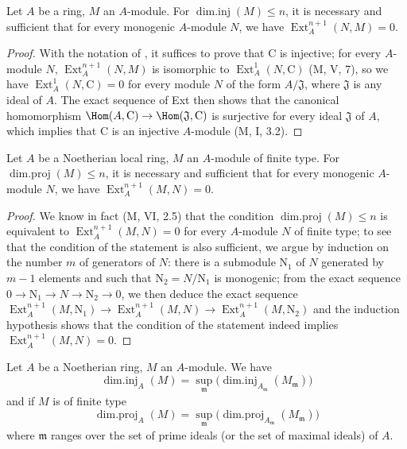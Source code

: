 \begin{lemma}[17.2.3]
\label{0.17.2.3}
Let $A$ be a ring, $M$ an $A$-module.
For $\operatorname{dim.inj}(M)\leq n$, it is necessary and sufficient that for every monogenic $A$-module $N$, we have $\operatorname{Ext}^{n+1}_A(N,M)=0$.
\end{lemma}

\begin{proof}
With the notation of , it suffices to prove that $\mathrm{C}$ is injective;
for every $A$-module $N$, $\operatorname{Ext}^{n+1}_A(N,M)$ is isomorphic to $\operatorname{Ext}^1_A(N,\mathrm{C})$ (M, V, 7), so we have $\operatorname{Ext}^1_A(N,\mathrm{C})=0$ for every module $N$ of the form $A/\mathfrak{J}$, where $\mathfrak{J}$ is any ideal of $A$.
The exact sequence of Ext then shows that the canonical homomorphism $\Hom(A,\mathrm{C})\to\Hom(\mathfrak{J},\mathrm{C})$ is surjective for every ideal $\mathfrak{J}$ of $A$, which implies that $\mathrm{C}$ is an injective $A$-module (M, I, 3.2).
\end{proof}

\begin{lemma}[17.2.4]
\label{0.17.2.4}
Let $A$ be a Noetherian local ring, $M$ an $A$-module of finite type.
For $\operatorname{dim.proj}(M)\leq n$, it is necessary and sufficient that for every monogenic $A$-module $N$, we have $\operatorname{Ext}^{n+1}_A(M,N)=0$.
\end{lemma}

\begin{proof}
We know in fact (M, VI, 2.5) that the condition $\operatorname{dim.proj}(M)\leq n$ is equivalent to $\operatorname{Ext}^{n+1}_A(M,N)=0$ for every $A$-module $N$ of finite type;
to see that the condition of the statement is also sufficient, we argue by induction on the number $m$ of generators of $N$:
there is a submodule $\mathrm{N}_1$ of $N$ generated by $m-1$ elements and such that $\mathrm{N}_2=N/\mathrm{N}_1$ is monogenic;
from the exact sequence $0\to\mathrm{N}_1\to N\to\mathrm{N}_2\to 0$, we then deduce the exact sequence $\operatorname{Ext}^{n+1}_A(M,\mathrm{N}_1)\to\operatorname{Ext}^{n+1}_A(M,N)\to\operatorname{Ext}^{n+1}_A(M,\mathrm{N}_2)$ and the induction hypothesis shows that the condition of the statement indeed implies $\operatorname{Ext}^{n+1}_A(M,N)=0$.
\end{proof}

\begin{corollary}[17.2.5]
\label{0.17.2.5}
Let $A$ be a Noetherian ring, $M$ an $A$-module.
We have
\[
\label{0.17.2.5.1}
  \operatorname{dim.inj}_A(M)=\sup_\mathfrak{m}\big(\operatorname{dim.inj}_{A_\mathfrak{m}}(M_\mathfrak{m})\big)
  \tag{17.2.5.1}
\]
and if $M$ is of finite type
\[
\label{0.17.2.5.2}
  \operatorname{dim.proj}_A(M)=\sup_\mathfrak{m}\big(\operatorname{dim.proj}_{A_\mathfrak{m}}(M_\mathfrak{m})\big)
  \tag{17.2.5.2}
\]
where $\mathfrak{m}$ ranges over the set of prime ideals (or the set of maximal ideals) of $A$.
\end{corollary}


